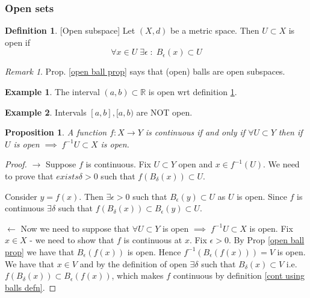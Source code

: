 \documentclass{article}
\theoremstyle{definition}
\newtheorem{defn}{Definition}[section]
\newtheorem{exmp}{Example}[section]
\theoremstyle{plain}%
\newtheorem{prop}[thm]{Proposition}
\theoremstyle{remark}
\newtheorem*{rem}{Remark}
\newcommand{\R}{\mathbb{R}}
\begin{document}
\subsubsection{Open sets}

\begin{defn}\label{open subspace defn}[Open subspace]
Let $(X,d)$ be a metric space. Then $U \subset X$ is open if \[\forall x \in U \; \exists \epsilon \; : \; B_{\epsilon}(x) \subset U\]
\end{defn}

\begin{rem}
Prop. \ref{open ball prop} says that (open) balls are open subspaces.
\end{rem}

\begin{exmp}
The interval $(a,b) \subset \R$ is open wrt definition \ref{open subspace defn}.
\end{exmp}

\begin{exmp}
Intervals $[a,b], [a,b)$ are NOT open.
\end{exmp}

\begin{prop}
A function $f : X \to Y$ is continuous if and only if $\forall U \subset Y$ then if $U$ is open $\implies \; f^{-1}U \subset X$ is open.
\end{prop}

\begin{proof}
$\rightarrow$ Suppose $f$ is continuous. Fix $U \subset Y$ open and $x \in f^{-1}(U)$. We need to prove that $exists \delta > 0$ such that $f(B_{\delta} (x)) \subset U$.

Consider $y = f(x)$. Then $\exists \epsilon > 0$ such that $B_{\epsilon}(y) \subset U$ as $U$ is open. Since $f$ is continuous $\exists \delta$ such that $f(B_{\delta}(x)) \subset B_{\epsilon}(y) \subset U$.

$\leftarrow$ Now we need to suppose that $\forall U \subset Y$ is open $\implies \; f^{-1}U \subset X$ is open. Fix $x \in X$ - we need to show that $f$ is continuous at $x$. Fix $\epsilon > 0$. By Prop \ref{open ball prop} we have that $B_{\epsilon}(f(x))$ is open. Hence $f^{-1} (B_{\epsilon}(f(x))) = V$ is open. We have that $x \in V$ and by the definition of open $\exists \delta$ such that $B_{\delta}(x) \subset V$ i.e. $f(B_{\delta}(x)) \subset B_{\epsilon}(f(x))$, which makes $f$ continuous by definition \ref{cont using balls defn}.
\end{proof}
\end{document}
